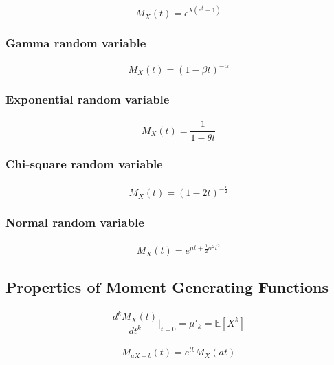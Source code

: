 \documentclass[titlepage]{article}
\begin{document}
            \paragraph{
                $$M_X(t)=e^{\lambda(e^t-1)}$$
            }
        \subsubsection{Gamma random variable}
            \paragraph{
                $$M_X(t)=(1-\beta t)^{-\alpha}$$
            }
        \subsubsection{Exponential random variable}
            \paragraph{
                $$M_X(t)=\frac{1}{1-\theta t}$$
            }
        \subsubsection{Chi-square random variable}
            \paragraph{
                $$M_X(t)=(1-2t)^{-\frac{v}{2}}$$
            }
        \subsubsection{Normal random variable}
            \paragraph{
                $$M_X(t)=e^{\mu t+\frac{1}{2}\sigma^2 t^2}$$
            }
        \subsection{Properties of Moment Generating Functions}
            \paragraph{
                $$\frac{d^kM_X(t)}{dt^k}|_{t=0}=\mu'_k=\mathbb{E}[X^k]$$
            }
            \paragraph{
                $$M_{aX+b}(t)=e^{tb}M_X(at)$$
            }
\end{document}
